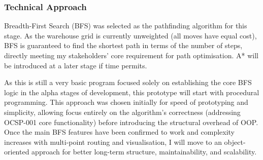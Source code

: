 \subsubsection{Technical Approach}

Breadth-First Search (BFS) was selected as the pathfinding algorithm for this stage. As the warehouse grid is currently unweighted (all moves have equal cost), BFS is guaranteed to find the shortest path in terms of the number of steps, directly meeting my stakeholders' core requirement for path optimisation. A* will be introduced at a later stage if time permits.

As this is still a very basic program focused solely on establishing the core BFS logic in the alpha stages of development, this prototype will start with procedural programming. This approach was chosen initially for speed of prototyping and simplicity, allowing focus entirely on the algorithm's correctness (addressing OCSP-001 core functionality) before introducing the structural overhead of OOP. Once the main BFS features have been confirmed to work and complexity increases with multi-point routing and visualisation, I will move to an object-oriented approach for better long-term structure, maintainability, and scalability.
